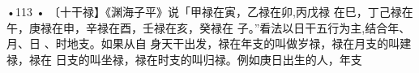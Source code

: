 •113 •
〔十干禄】《渊海子平》说「甲禄在寅，乙禄在卯,丙戊禄
在巳，丁己禄在午，庚禄在申，辛禄在酉，壬禄在亥，癸禄在
子。”看法以日干五行为主,结合年、月、日 、时地支。如果从自
身天干出发，禄在年支的叫做岁禄，禄在月支的叫建禄，禄在
日支的叫坐禄，禄在时支的叫归禄。例如庚日出生的人，年支
